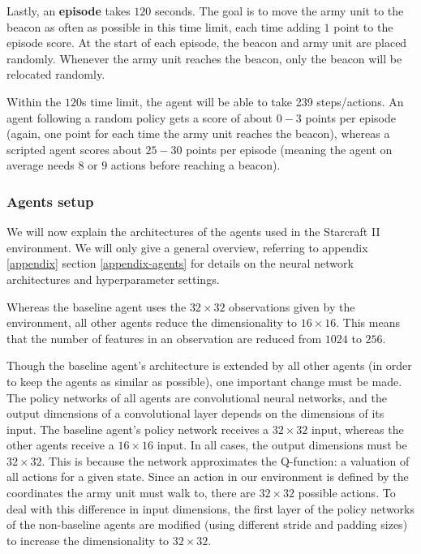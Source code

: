 Lastly, an \textbf{episode} takes $120$ seconds. The goal is to move the army unit to the beacon as often as possible in this time limit, each time adding $1$ point to the episode score. At the start of each episode, the beacon and army unit are placed randomly. Whenever the army unit reaches the beacon, only the beacon will be relocated randomly. 

Within the $120$s time limit, the agent will be able to take 239 steps/actions. An agent following a random policy gets a score of about $0-3$ points per episode (again, one point for each time the army unit reaches the beacon), whereas a scripted agent scores about $25-30$ points per episode (meaning the agent on average needs $8$ or $9$ actions before reaching a beacon).

\subsubsection*{Agents setup}
We will now explain the architectures of the agents used in the Starcraft II environment. We will only give a general overview, referring to appendix \ref{appendix} section \ref{appendix-agents} for details on the neural network architectures and hyperparameter settings. 

Whereas the baseline agent uses the $32 \times 32$ observations given by the environment, all other agents reduce the dimensionality to $16 \times 16$. This means that the number of features in an observation are reduced from $1024$ to $256$.

Though the baseline agent's architecture is extended by all other agents (in order to keep the agents as similar as possible), one important change must be made. The policy networks of all agents are convolutional neural networks, and the output dimensions of a convolutional layer depends on the dimensions of its input. The baseline agent's policy network receives a $32 \times 32$ input, whereas the other agents receive a $16 \times 16$ input. In all cases, the output dimensions must be $32 \times 32$. This is because the network approximates the Q-function: a valuation of all actions for a given state. Since an action in our environment is defined by the coordinates the army unit must walk to, there are $32 \times 32$ possible actions. To deal with this difference in input dimensions, the first layer of the policy networks of the non-baseline agents are modified (using different stride and padding sizes) to increase the dimensionality to $32 \times 32$.\par

